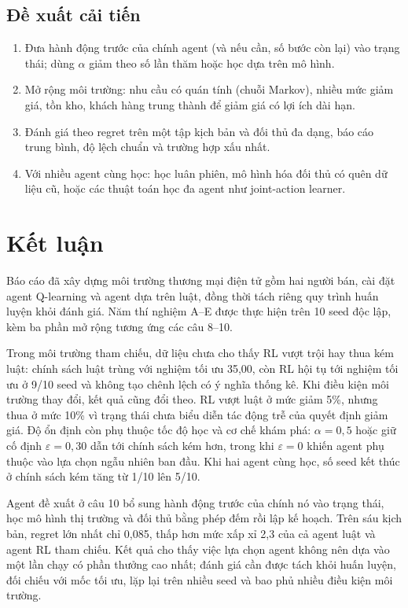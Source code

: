 \documentclass[12pt,a4paper]{report}
\begin{document}
\section{Đề xuất cải tiến}
\begin{enumerate}
\item Đưa hành động trước của chính agent (và nếu cần, số bước còn lại) vào trạng
  thái; dùng $\alpha$ giảm theo số lần thăm hoặc học dựa trên mô hình.
\item Mở rộng môi trường: nhu cầu có quán tính (chuỗi Markov), nhiều mức giảm giá,
  tồn kho, khách hàng trung thành để giảm giá có lợi ích dài hạn.
\item Đánh giá theo regret trên một tập kịch bản và đối thủ đa dạng, báo cáo trung
  bình, độ lệch chuẩn và trường hợp xấu nhất.
\item Với nhiều agent cùng học: học luân phiên, mô hình hóa đối thủ có quên dữ liệu
  cũ, hoặc các thuật toán học đa agent như joint-action learner.
\end{enumerate}

\chapter{Kết luận}
\label{chap:conclusion}
Báo cáo đã xây dựng môi trường thương mại điện tử gồm hai người bán, cài đặt agent
Q-learning và agent dựa trên luật, đồng thời tách riêng quy trình huấn luyện khỏi đánh
giá. Năm thí nghiệm A--E được thực hiện trên 10 seed độc lập, kèm ba phần mở rộng tương
ứng các câu 8--10.

Trong môi trường tham chiếu, dữ liệu chưa cho thấy RL vượt trội hay thua kém luật:
chính sách luật trùng với nghiệm tối ưu 35{,}00, còn RL hội tụ tới nghiệm tối ưu ở
9/10 seed và không tạo chênh lệch có ý nghĩa thống kê. Khi điều kiện môi trường thay
đổi, kết quả cũng đổi theo. RL vượt luật ở mức giảm 5\%, nhưng thua ở mức 10\% vì
trạng thái chưa biểu diễn tác động trễ của quyết định giảm giá. Độ ổn định còn phụ
thuộc tốc độ học và cơ chế khám phá: $\alpha=0{,}5$ hoặc giữ cố định
$\varepsilon=0{,}30$ dẫn tới chính sách kém hơn, trong khi $\varepsilon=0$ khiến agent
phụ thuộc vào lựa chọn ngẫu nhiên ban đầu. Khi hai agent cùng học, số seed kết thúc
ở chính sách kém tăng từ 1/10 lên 5/10.

Agent đề xuất ở câu 10 bổ sung hành động trước của chính nó vào trạng thái, học mô
hình thị trường và đối thủ bằng phép đếm rồi lập kế hoạch. Trên sáu kịch bản, regret
lớn nhất chỉ 0{,}085, thấp hơn mức xấp xỉ 2{,}3 của cả agent luật và agent RL tham
chiếu. Kết quả cho thấy việc lựa chọn agent không nên dựa vào một lần chạy có phần
thưởng cao nhất; đánh giá cần được tách khỏi huấn luyện, đối chiếu với mốc tối ưu,
lặp lại trên nhiều seed và bao phủ nhiều điều kiện môi trường.
\end{document}
